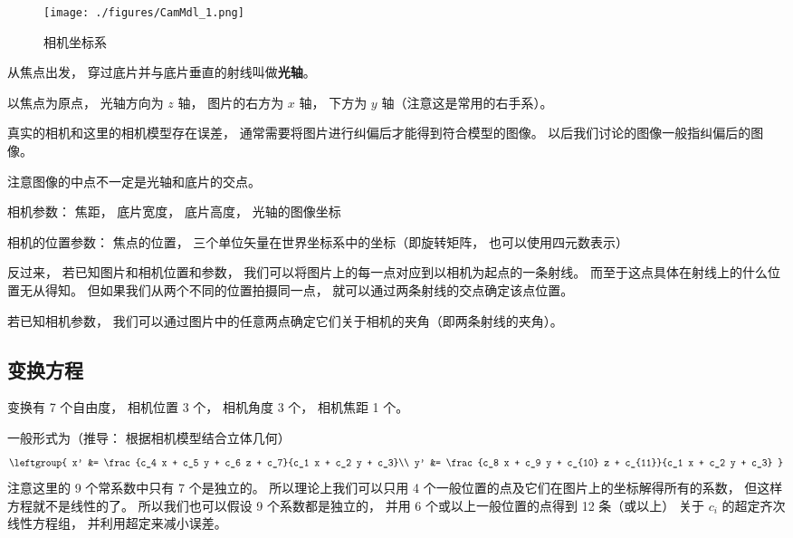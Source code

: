 
\begin{issues}
\issueDraft
\end{issues}


\begin{figure}[ht]
\centering
\texttt{[image: ./figures/CamMdl\_1.png]}
\caption{相机坐标系} \label{CamMdl_fig1}
\end{figure}

从焦点出发， 穿过底片并与底片垂直的射线叫做\textbf{光轴}。

以焦点为原点， 光轴方向为 $z$ 轴， 图片的右方为 $x$ 轴， 下方为 $y$ 轴（注意这是常用的右手系）。

真实的相机和这里的相机模型存在误差， 通常需要将图片进行纠偏后才能得到符合模型的图像。 以后我们讨论的图像一般指纠偏后的图像。

注意图像的中点不一定是光轴和底片的交点。

相机参数： 焦距， 底片宽度， 底片高度， 光轴的图像坐标

相机的位置参数： 焦点的位置， 三个单位矢量在世界坐标系中的坐标（即旋转矩阵， 也可以使用四元数表示）

反过来， 若已知图片和相机位置和参数， 我们可以将图片上的每一点对应到以相机为起点的一条射线。 而至于这点具体在射线上的什么位置无从得知。 但如果我们从两个不同的位置拍摄同一点， 就可以通过两条射线的交点确定该点位置。

若已知相机参数， 我们可以通过图片中的任意两点确定它们关于相机的夹角（即两条射线的夹角）。

\subsection{变换方程}
变换有 7 个自由度， 相机位置 3 个， 相机角度 3 个， 相机焦距 1 个。

一般形式为（推导： 根据相机模型结合立体几何）
\begin{equation}\label{CamMdl_eq1}
\leftgroup{
x' &= \frac{c_4 x + c_5 y + c_6 z + c_7}{c_1 x + c_2 y + c_3}\\
y' &= \frac{c_8 x + c_9 y + c_{10} z + c_{11}}{c_1 x + c_2 y + c_3}
}
\end{equation}
注意这里的 9 个常系数中只有 7 个是独立的。 所以理论上我们可以只用 4 个一般位置的点及它们在图片上的坐标解得所有的系数， 但这样方程就不是线性的了。 所以我们也可以假设 9 个系数都是独立的， 并用 6 个或以上一般位置的点得到 12 条（或以上） 关于 $c_i$ 的超定齐次线性方程组， 并利用超定来减小误差。

